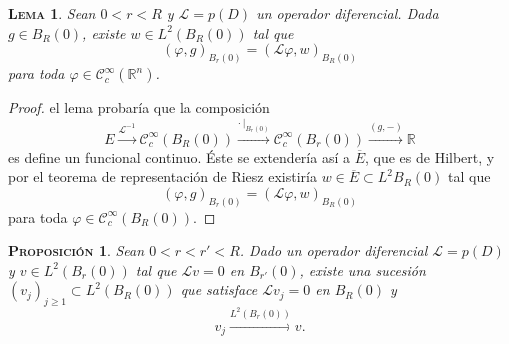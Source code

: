 \documentclass[11pt]{article}
\theoremstyle{colored}
\newtheorem{proposition}{\scshape Proposición}
\newtheorem{lemma}{\scshape Lema}
\newcommand{\R}{\mathbb{R}}
\newcommand{\C}{\mathscr{C}}
\renewcommand{\L}{\mathscr{L}}
\begin{document}
\begin{lemma} Sean $0 < r < R$ y $\L = p(D)$ un operador diferencial. Dada $g \in B_R(0)$, existe $w\in L^2(B_R(0))$ tal que
\[
(\varphi,g)_{B_r(0)} = (\L \varphi, w)_{B_R(0)}
\]
para toda $\varphi \in \C_c^\infty(\R^n)$.
\end{lemma}
\begin{proof} el lema probaría que la composición
\[
E \xrightarrow{\L^{-1}} \C_c^\infty(B_R(0)) \xrightarrow{\cdot \ |_{B_r(0)}} \C_c^\infty(B_r(0)) \xrightarrow{(g,-)}  \R
\]
es define un funcional continuo. Éste se extendería así a $\overline{E}$, que es de Hilbert, y por el teorema de representación de Riesz existiría $w \in \overline{E} \subset L^2{B_R(0)}$ tal que
\[
(\varphi,g)_{B_r(0)} = (\L \varphi, w)_{B_R(0)}
\]
para toda $\varphi \in \C_c^\infty(B_R(0))$.  
\end{proof}

\begin{proposition} \label{aprox} Sean $0 < r < r' < R$. Dado un operador diferencial $\L = p(D)$ y $v \in L^2(B_r(0))$ tal que $\L v = 0$ en $B_{r'}(0)$, existe una sucesión $(v_j)_{j \geq 1} \subset L^2(B_R(0))$ que satisface $\L v_j = 0$ en $B_R(0)$ y 
\[
v_j \xrightarrow{L^2(B_r(0))} v.
\]
\end{proposition}
\end{document}
